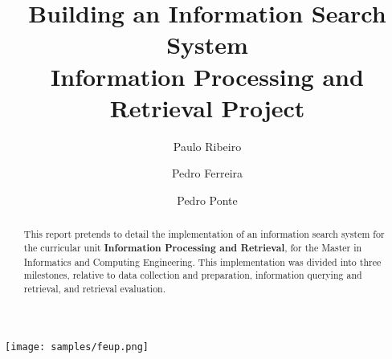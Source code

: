 \documentclass[sigplan,screen]{acmart}
\begin{document}
\title{%
    Building an Information Search System \\
    \large Information Processing and Retrieval Project
    }


\author{Paulo Ribeiro}

\author{Pedro Ferreira}

\author{Pedro Ponte}

\begin{abstract}
  This report pretends to detail the implementation of an information search system for the curricular unit \textbf{Information Processing and Retrieval}, for the  Master in Informatics and Computing Engineering. This implementation was divided into three milestones, relative to data collection and preparation, information querying and retrieval, and retrieval evaluation.
\end{abstract}


\begin{teaserfigure}
    \begin{center}
      \texttt{[image: samples/feup.png]}
      \label{fig:teaser}
    \end{center}
\end{teaserfigure}
\end{document}
